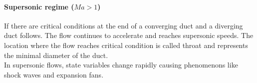\paragraph{Supersonic regime (\(Ma > 1\))} 

	If there are critical conditions at the end of a converging duct and a diverging duct follows.
	The flow continues to accelerate and reaches supersonic speeds.
	The location where the flow reaches critical condition is called throat and represents the minimal diameter of the duct.\\
	In supersonic flows, state variables change rapidly causing phenomenons like shock waves and expansion fans.
	
	
